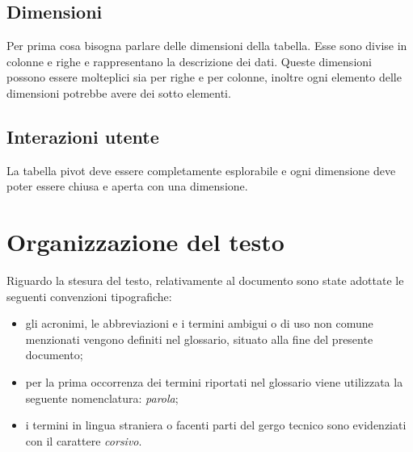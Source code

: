\subsection{Dimensioni}
Per prima cosa bisogna parlare delle dimensioni della tabella. Esse sono divise in colonne e righe e rappresentano la descrizione dei dati. Queste dimensioni possono essere molteplici sia per righe e per colonne, inoltre ogni elemento delle dimensioni potrebbe avere dei sotto elementi.
\subsection{Interazioni utente}
La tabella pivot deve essere completamente esplorabile e ogni dimensione deve poter essere chiusa e aperta con una dimensione.

\section{Organizzazione del testo}
Riguardo la stesura del testo, relativamente al documento sono state adottate le seguenti convenzioni tipografiche:
\begin{itemize}
	\item gli acronimi, le abbreviazioni e i termini ambigui o di uso non comune menzionati vengono definiti nel glossario, situato alla fine del presente documento;
	\item per la prima occorrenza dei termini riportati nel glossario viene utilizzata la seguente nomenclatura: \emph{parola}\glo;
	\item i termini in lingua straniera o facenti parti del gergo tecnico sono evidenziati con il carattere \emph{corsivo}.
\end{itemize}